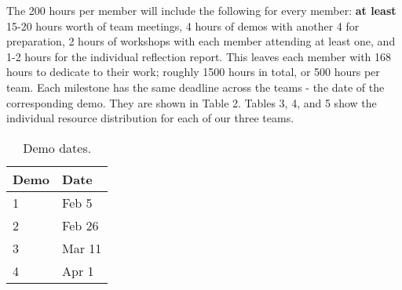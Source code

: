 \documentclass{article}
\begin{document}
The 200 hours per member will include the following for every member: {\bf at least} 15-20 hours worth of team meetings, 4 hours of demos with another 4 for preparation, 2 hours of workshops with each member attending at least one, and 1-2 hours for the individual reflection report. This leaves each member with 168 hours to dedicate to their work; roughly 1500 hours in total, or 500 hours per team. Each milestone has the same deadline across the teams - the date of the corresponding demo. They are shown in Table 2. Tables 3, 4, and 5 show the individual resource distribution for each of our three teams.
\begin{table}[]
  \begin{center}
  \begin{tabular}{ll}
    \hline
    Demo & Date   \\
    \hline
    1 & Feb 5 \\
    2 & Feb 26 \\
    3 & Mar 11 \\
    4 & Apr 1\\ \hline
  \end{tabular}
  \end{center}
  \caption{Demo dates.}
\end{table}
\end{document}
